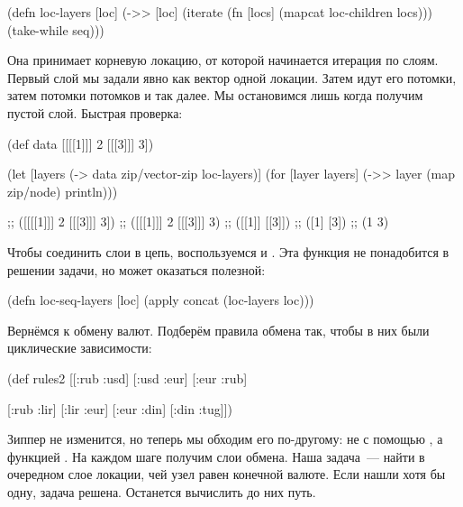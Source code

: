 \begin{english}
  \begin{clojure}
(defn loc-layers [loc]
  (->> [loc]
       (iterate (fn [locs]
                  (mapcat loc-children locs)))
       (take-while seq)))
  \end{clojure}
\end{english}

Она принимает корневую локацию, от которой начинается итерация по слоям. Первый
слой мы задали явно как вектор одной локации. Затем идут его потомки, затем
потомки потомков и так далее. Мы остановимся лишь когда получим пустой
слой. Быстрая проверка:

\begin{english}
  \begin{clojure}
(def data [[[[1]]] 2 [[[3]]] 3])

(let [layers (-> data
                 zip/vector-zip
                 loc-layers)]
  (for [layer layers]
    (->> layer
         (map zip/node)
         println)))

;; ([[[[1]]] 2 [[[3]]] 3])
;; ([[[1]]] 2 [[[3]]] 3)
;; ([[1]] [[3]])
;; ([1] [3])
;; (1 3)
  \end{clojure}
\end{english}

Чтобы соединить слои в цепь, воспользуемся  и . Эта функция не
понадобится в решении задачи, но может оказаться полезной:

\begin{english}
  \begin{clojure}
(defn loc-seq-layers [loc]
  (apply concat (loc-layers loc)))
  \end{clojure}
\end{english}

Вернёмся к обмену валют. Подберём правила обмена так, чтобы в них были
циклические зависимости:

\begin{english}
  \begin{clojure}
(def rules2
  [[:rub :usd]
   [:usd :eur]
   [:eur :rub]

   [:rub :lir]
   [:lir :eur]
   [:eur :din]
   [:din :tug]])
  \end{clojure}
\end{english}

Зиппер не изменится, но теперь мы обходим его по-другому: не с помощью
, а функцией . На каждом шаге получим слои обмена. Наша
задача~--- найти в очередном слое локации, чей узел равен конечной валюте. Если
нашли хотя бы одну, задача решена. Останется вычислить до них путь.

